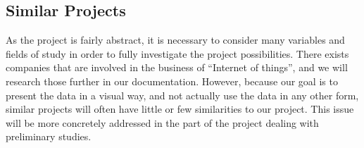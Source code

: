 ﻿\documentclass[../document.tex]{subfiles}
\begin{document}
\subsection*{Similar Projects}
As the project is fairly abstract, it is necessary to consider many variables and fields of study in order to fully investigate the project possibilities. There exists companies that are involved in the business of ``Internet of things'', and we will research those further in our documentation. However, because our goal is to present the data in a visual way, and not actually use the data in any other form, similar projects will often have little or few similarities to our project. This issue will be more concretely addressed in the part of the project dealing with preliminary studies.
\end{document}
